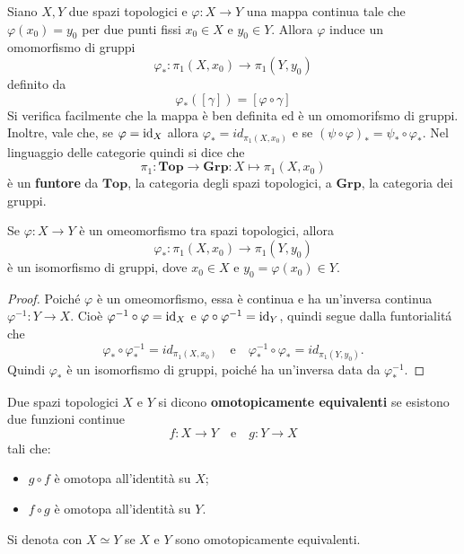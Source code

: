 \documentclass[]{article}
\begin{document}
\begin{remark}  \nl
    Siano $X, Y$ due spazi topologici e $\varphi: X \to Y$ una mappa continua tale che $\varphi(x_0) = y_0$ per due punti fissi $x_0 \in X$ e $y_0 \in Y$. \nl
    Allora $\varphi$ induce un omomorfismo di gruppi
    \[
        \varphi_*: \pi_1(X, x_0) \to \pi_1(Y, y_0)
    \]
    definito da
    \[
        \varphi_*([\gamma]) = [\varphi \circ \gamma]
    \]
    Si verifica facilmente che la mappa \`e ben definita ed \`e un omomorifsmo di gruppi. \nl
    Inoltre, vale che,
    se $\varphi = \mathrm{id}_X$ allora $\varphi_* = id_{\pi_1(X, x_0)}$ e se $(\psi \circ \varphi)_* = \psi_* \circ \varphi_*$. \nl
    Nel linguaggio delle categorie quindi si dice che 
    \[  
        \pi_1: \mathbf{Top} \to \mathbf{Grp}: X \mapsto \pi_1(X, x_0)
    \]
    è un \textbf{funtore} da $\mathbf{Top}$, la categoria degli spazi topologici, a $\mathbf{Grp}$, la categoria dei gruppi.
\end{remark}

\begin{proposition} \nl
    Se $\varphi: X \to Y$ è un omeomorfismo tra spazi topologici, allora
    \[
        \varphi_*: \pi_1(X, x_0) \to \pi_1(Y, y_0)
    \]
    è un isomorfismo di gruppi, dove $x_0 \in X$ e $y_0 = \varphi(x_0) \in Y$.
\end{proposition}

\begin{proof} \nl
    Poich\'e $\varphi$ è un omeomorfismo, essa è continua e ha un'inversa continua $\varphi^{-1}: Y \to X$. \nl
    Cio\`e  $\varphi^{-1} \circ \varphi = \mathrm{id}_X$ e $\varphi \circ \varphi^{-1} = \mathrm{id}_Y$, quindi segue dalla funtorialit\'a
    che
    \[
        \varphi_* \circ \varphi^{-1}_* = id_{\pi_1(X, x_0)} \quad \text{e} \quad \varphi^{-1}_* \circ \varphi_* = id_{\pi_1(Y, y_0)}.
    \]
    Quindi $\varphi_*$ è un isomorfismo di gruppi, poiché ha un'inversa data da $\varphi^{-1}_*$.
\end{proof}

\begin{definition}  \nl
    Due spazi topologici $X$ e $Y$ si dicono \textbf{omotopicamente equivalenti} se esistono due funzioni continue
    \[
        f: X \to Y \quad \text{e} \quad g: Y \to X
    \]
    tali che:
    \begin{itemize}
        \item $g \circ f$ è omotopa all'identità su $X$;
        \item $f \circ g$ è omotopa all'identità su $Y$.
    \end{itemize}
    Si denota con $X \simeq Y$ se $X$ e $Y$ sono omotopicamente equivalenti.
\end{definition}
\end{document}
